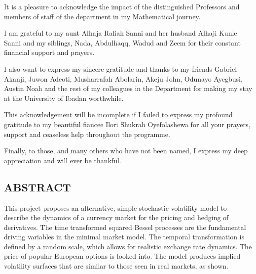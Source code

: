 \documentclass[a4 paper, 12pt]{report}
\theoremstyle{plain}
\begin{document}
\par It is a pleasure to acknowledge the impact of the distinguished Professors and
members of staff of the department in my Mathematical journey.\\

\par I am grateful to my aunt Alhaja Rafiah Sanni and her husband Alhaji Kunle Sanni and my siblings, Nada, Abdulhaqq, Wadud and Zeem for their constant financial
support and prayers.\\

\par I also want to express my sincere gratitude and thanks to my friends Gabriel Akanji,
Juwon Adeoti, Musharrafah Abolarin, Akeju John, Odunayo Ayegbusi, Austin Noah and the rest of my colleagues in the
Department for making my stay at the University of Ibadan worthwhile.\\

\par This acknowledgement will be incomplete if I failed to express my profound
gratitude to my beautiful fiancee Ilori Shukrah Oyefolashewa for all your
prayers, support and ceaseless help throughout the programme.\\

\par Finally, to those, and many others who have not been named, I express my
deep appreciation and will ever be thankful.

\newpage
\begin{center}
	\section*{ABSTRACT}
\end{center}
\noindent
\par 
This project proposes an alternative, simple stochastic volatility model to describe the dynamics of a currency market for the pricing and hedging of derivatives. The time transformed squared Bessel processes are the fundamental driving variables in the minimal market model. The temporal transformation is defined by a random scale, which allows for realistic exchange rate dynamics. The price of popular European options is looked into. The model produces implied volatility surfaces that are similar to those seen in real markets, as shown.
\end{document}
